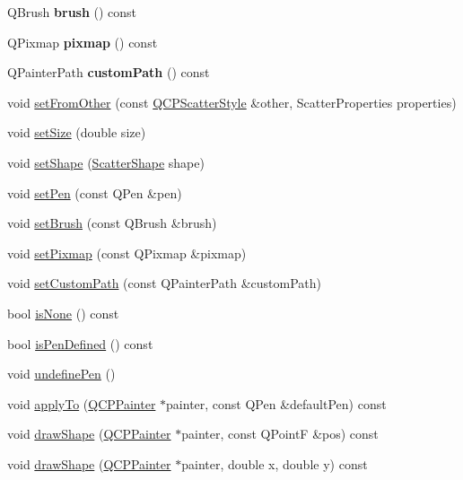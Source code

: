 \begin{DoxyCompactItemize}
\item 
Q\+Brush {\bfseries brush} () const \hypertarget{classQCPScatterStyle_a46bf481d84bfa31b287dd43a3bf86d37}{}\label{classQCPScatterStyle_a46bf481d84bfa31b287dd43a3bf86d37}

\item 
Q\+Pixmap {\bfseries pixmap} () const \hypertarget{classQCPScatterStyle_a9bab44cc41fcd585621a4b3e0e48231b}{}\label{classQCPScatterStyle_a9bab44cc41fcd585621a4b3e0e48231b}

\item 
Q\+Painter\+Path {\bfseries custom\+Path} () const \hypertarget{classQCPScatterStyle_a4dd4998dfb0d6889205668a06c790328}{}\label{classQCPScatterStyle_a4dd4998dfb0d6889205668a06c790328}

\item 
void \hyperlink{classQCPScatterStyle_a7d59ba8864914f765817841089e436f1}{set\+From\+Other} (const \hyperlink{classQCPScatterStyle}{Q\+C\+P\+Scatter\+Style} \&other, Scatter\+Properties properties)
\item 
void \hyperlink{classQCPScatterStyle_aaefdd031052892c4136129db68596e0f}{set\+Size} (double size)
\item 
void \hyperlink{classQCPScatterStyle_a7c641c4d4c6d29cb705d3887cfce91c1}{set\+Shape} (\hyperlink{classQCPScatterStyle_adb31525af6b680e6f1b7472e43859349}{Scatter\+Shape} shape)
\item 
void \hyperlink{classQCPScatterStyle_a761f1f229cc0ca4703e1e2b89f6dd1ba}{set\+Pen} (const Q\+Pen \&pen)
\item 
void \hyperlink{classQCPScatterStyle_a74d692aaeb8d4b36d6f7d510e44264b1}{set\+Brush} (const Q\+Brush \&brush)
\item 
void \hyperlink{classQCPScatterStyle_a5fb611d46acfac520d7b89a1c71d9246}{set\+Pixmap} (const Q\+Pixmap \&pixmap)
\item 
void \hyperlink{classQCPScatterStyle_a96a3e949f90b2afe5677ca9412a12a1e}{set\+Custom\+Path} (const Q\+Painter\+Path \&custom\+Path)
\item 
bool \hyperlink{classQCPScatterStyle_aa3861281108d0adbeb291c820ea3925c}{is\+None} () const 
\item 
bool \hyperlink{classQCPScatterStyle_a7f1385a8d5e4f349a6b8030723fbd0f7}{is\+Pen\+Defined} () const 
\item 
void \hyperlink{classQCPScatterStyle_acabc2a8c83d650b946f50c3166b6c35e}{undefine\+Pen} ()
\item 
void \hyperlink{classQCPScatterStyle_a81817dfd404635f211e6ff2a04657d36}{apply\+To} (\hyperlink{classQCPPainter}{Q\+C\+P\+Painter} $\ast$painter, const Q\+Pen \&default\+Pen) const 
\item 
void \hyperlink{classQCPScatterStyle_aeaf6dbadb0b0e6d890a6e3bbe5aebece}{draw\+Shape} (\hyperlink{classQCPPainter}{Q\+C\+P\+Painter} $\ast$painter, const Q\+PointF \&pos) const 
\item 
void \hyperlink{classQCPScatterStyle_ae76811ac9f70ebf7a2b4c759853e6ed8}{draw\+Shape} (\hyperlink{classQCPPainter}{Q\+C\+P\+Painter} $\ast$painter, double x, double y) const 
\end{DoxyCompactItemize}
